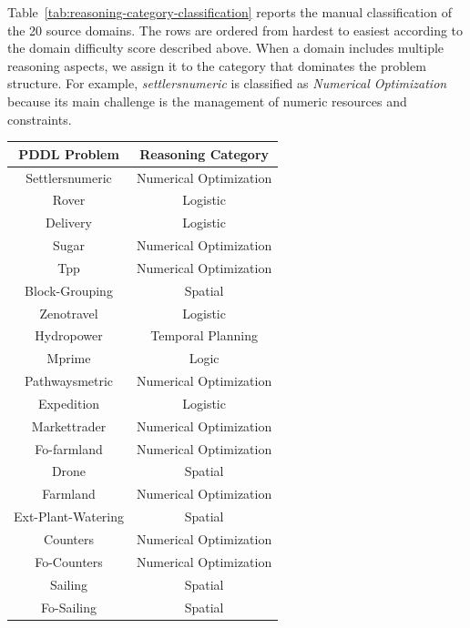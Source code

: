 Table~\ref{tab:reasoning-category-classification} reports the manual classification of the 20 source domains. The rows are ordered from hardest to easiest according to the domain difficulty score described above. When a domain includes multiple reasoning aspects, we assign it to the category that dominates the problem structure. For example, \textit{settlersnumeric} is classified as \textit{Numerical Optimization} because its main challenge is the management of numeric resources and constraints.

\begin{table}[H] \footnotesize
        \centering
        \renewcommand{\arraystretch}{1.25} 
        
        \begin{tabular}{c|c}
            \toprule
            
            \textbf{PDDL Problem} & \textbf{Reasoning Category} \\
            
            \midrule[1pt]
            \addlinespace[0.25cm]
            Settlersnumeric & Numerical Optimization \\
            \midrule
            Rover & Logistic \\
            \midrule
            Delivery & Logistic \\
            \midrule
            Sugar & Numerical Optimization \\
            \midrule
            Tpp & Numerical Optimization \\
            \midrule
            Block-Grouping & Spatial \\
            \midrule
            Zenotravel & Logistic \\
            \midrule
            Hydropower & Temporal Planning \\
            \midrule
            Mprime & Logic \\
            \midrule
            Pathwaysmetric & Numerical Optimization \\
            \midrule
            Expedition & Logistic \\
            \midrule
            Markettrader & Numerical Optimization \\
            \midrule
            Fo-farmland & Numerical Optimization \\
            \midrule
            Drone & Spatial \\
            \midrule
            Farmland & Numerical Optimization \\
            \midrule
            Ext-Plant-Watering & Spatial \\
            \midrule
            Counters & Numerical Optimization \\
            \midrule
            Fo-Counters & Numerical Optimization \\
            \midrule
            Sailing & Spatial \\
            \midrule
            Fo-Sailing & Spatial \\
            

\end{tabular}
\end{table}
